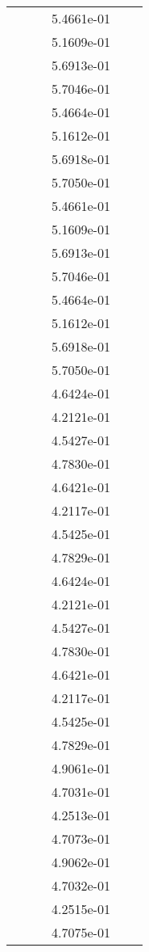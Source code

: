 \begin{xltabular}{\textwidth}{r|rS[table-format=1.3e+2]S[table-format=1.4e+2]S[table-format=1.4e+2]S[table-format=-1.5]}
&  &  & 5.4661e-01 & & \\
&  &  & 5.1609e-01 & & \\
&  &  & 5.6913e-01 & & \\
&  &  & 5.7046e-01 & & \\
&  &  & 5.4664e-01 & & \\
&  &  & 5.1612e-01 & & \\
&  &  & 5.6918e-01 & & \\
&  &  & 5.7050e-01 & & \\
&  &  & 5.4661e-01 & & \\
&  &  & 5.1609e-01 & & \\
&  &  & 5.6913e-01 & & \\
&  &  & 5.7046e-01 & & \\
&  &  & 5.4664e-01 & & \\
&  &  & 5.1612e-01 & & \\
&  &  & 5.6918e-01 & & \\
&  &  & 5.7050e-01 & & \\
&  &  & 4.6424e-01 & & \\
&  &  & 4.2121e-01 & & \\
&  &  & 4.5427e-01 & & \\
&  &  & 4.7830e-01 & & \\
&  &  & 4.6421e-01 & & \\
&  &  & 4.2117e-01 & & \\
&  &  & 4.5425e-01 & & \\
&  &  & 4.7829e-01 & & \\
&  &  & 4.6424e-01 & & \\
&  &  & 4.2121e-01 & & \\
&  &  & 4.5427e-01 & & \\
&  &  & 4.7830e-01 & & \\
&  &  & 4.6421e-01 & & \\
&  &  & 4.2117e-01 & & \\
&  &  & 4.5425e-01 & & \\
&  &  & 4.7829e-01 & & \\
&  &  & 4.9061e-01 & & \\
&  &  & 4.7031e-01 & & \\
&  &  & 4.2513e-01 & & \\
&  &  & 4.7073e-01 & & \\
&  &  & 4.9062e-01 & & \\
&  &  & 4.7032e-01 & & \\
&  &  & 4.2515e-01 & & \\
&  &  & 4.7075e-01 & & \\

\end{xltabular}
